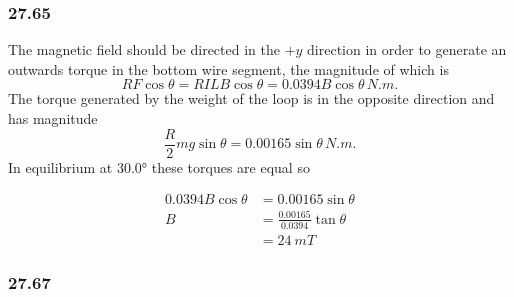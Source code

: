 \documentclass{article}
\begin{document}
\subsubsection{27.65}

The magnetic field should be directed in the $+y$ direction in order to generate an outwards torque in the bottom wire segment, the magnitude of which is \[R F \cos \theta = R I L B \cos \theta = 0.0394 B \cos \theta \,\unit{N.m}.\] The torque generated by the weight of the loop is in the opposite direction and has magnitude \[\frac{R}{2} m g \sin \theta = 0.00165 \sin \theta \,\unit{N.m}.\] In equilibrium at $\ang{30.0}$ these torques are equal so

\begin{align*}
  0.0394 B \cos \theta & = 0.00165 \sin \theta                \\
  B                    & = \frac{0.00165}{0.0394} \tan \theta \\
                       & = \qty{24}{mT}
\end{align*}

\subsubsection{27.67}
\end{document}
